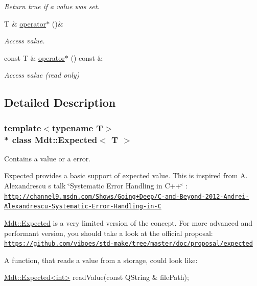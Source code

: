 \begin{DoxyCompactItemize}
\begin{DoxyCompactList}\small\item\em Return true if a value was set. \end{DoxyCompactList}\item 
T \& \hyperlink{class_mdt_1_1_expected_a6aab8021eae1bd2e24bf42aad0fab67e}{operator$\ast$} ()\&
\begin{DoxyCompactList}\small\item\em Access value. \end{DoxyCompactList}\item 
const T \& \hyperlink{class_mdt_1_1_expected_aaf11786a3d1fdb6ae8deb71639d83c29}{operator$\ast$} () const \&
\begin{DoxyCompactList}\small\item\em Access value (read only) \end{DoxyCompactList}\end{DoxyCompactItemize}


\subsection{Detailed Description}
\subsubsection*{template$<$typename T$>$\\*
class Mdt\+::\+Expected$<$ T $>$}

Contains a value or a error. 

\hyperlink{class_mdt_1_1_expected}{Expected} provides a basic support of expected value. This is inspired from A. Alexandrescu \textquotesingle{}s talk \char`\"{}\+Systematic Error Handling in C++\char`\"{} \+: \href{http://channel9.msdn.com/Shows/Going+Deep/C-and-Beyond-2012-Andrei-Alexandrescu-Systematic-Error-Handling-in-C}{\tt http\+://channel9.\+msdn.\+com/\+Shows/\+Going+\+Deep/\+C-\/and-\/\+Beyond-\/2012-\/\+Andrei-\/\+Alexandrescu-\/\+Systematic-\/\+Error-\/\+Handling-\/in-\/C}

\hyperlink{class_mdt_1_1_expected}{Mdt\+::\+Expected} is a very limited version of the concept. For more advanced and performant version, you should take a look at the official proposal\+: \href{https://github.com/viboes/std-make/tree/master/doc/proposal/expected}{\tt https\+://github.\+com/viboes/std-\/make/tree/master/doc/proposal/expected}

A function, that reads a value from a storage, could look like\+: 
\begin{DoxyCode}
\hyperlink{class_mdt_1_1_expected}{Mdt::Expected<int>} readValue(\textcolor{keyword}{const} QString & filePath);
\end{DoxyCode}


